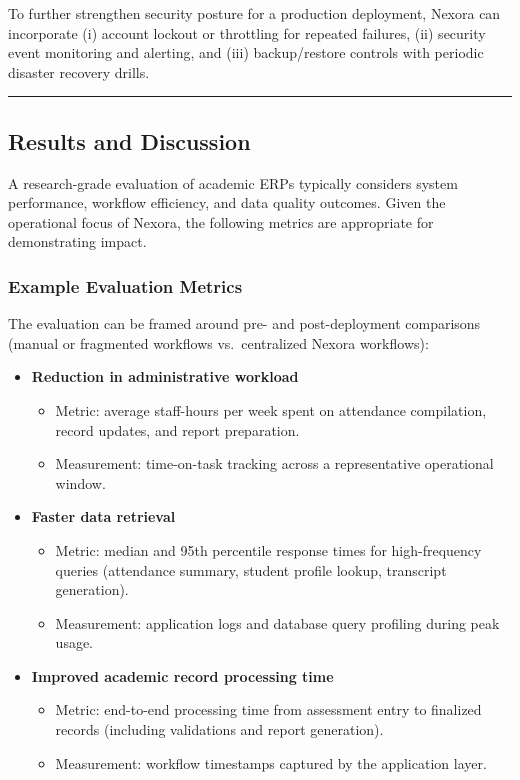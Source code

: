 \documentclass[11pt]{article}
\providecommand{\tightlist}{%
  \setlength{\itemsep}{0pt}\setlength{\parskip}{0pt}}
\begin{document}
To further strengthen security posture for a production deployment,
Nexora can incorporate (i) account lockout or throttling for repeated
failures, (ii) security event monitoring and alerting, and (iii)
backup/restore controls with periodic disaster recovery drills.

\begin{center}\rule{0.5\linewidth}{0.5pt}\end{center}

\subsection{Results and Discussion}\label{results-and-discussion}

A research-grade evaluation of academic ERPs typically considers system
performance, workflow efficiency, and data quality outcomes. Given the
operational focus of Nexora, the following metrics are appropriate for
demonstrating impact.

\subsubsection{Example Evaluation
Metrics}\label{example-evaluation-metrics}

The evaluation can be framed around pre- and post-deployment comparisons
(manual or fragmented workflows vs.~centralized Nexora workflows):

\begin{itemize}
\tightlist
\item
  \textbf{Reduction in administrative workload}

  \begin{itemize}
  \tightlist
  \item
    Metric: average staff-hours per week spent on attendance
    compilation, record updates, and report preparation.
  \item
    Measurement: time-on-task tracking across a representative
    operational window.
  \end{itemize}
\item
  \textbf{Faster data retrieval}

  \begin{itemize}
  \tightlist
  \item
    Metric: median and 95th percentile response times for high-frequency
    queries (attendance summary, student profile lookup, transcript
    generation).
  \item
    Measurement: application logs and database query profiling during
    peak usage.
  \end{itemize}
\item
  \textbf{Improved academic record processing time}

  \begin{itemize}
  \tightlist
  \item
    Metric: end-to-end processing time from assessment entry to
    finalized records (including validations and report generation).
  \item
    Measurement: workflow timestamps captured by the application layer.
  \end{itemize}
\end{itemize}
\end{document}
